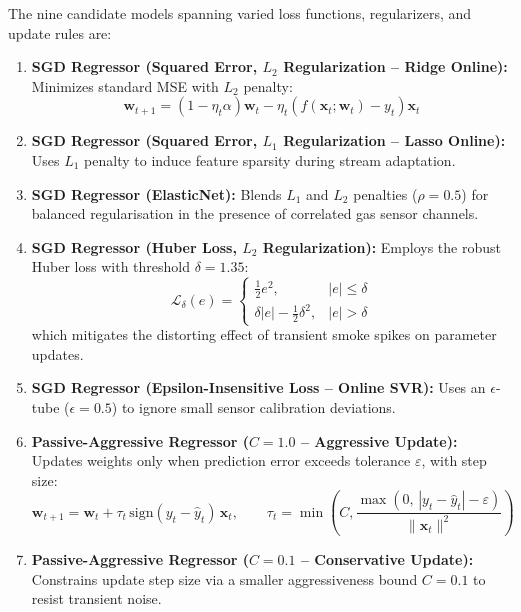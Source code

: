 The nine candidate models spanning varied loss functions, regularizers, and update rules are:
\begin{enumerate}[label=\textbf{M\arabic*:},leftmargin=*]
    \item \textbf{SGD Regressor (Squared Error, $L_2$ Regularization -- Ridge Online):} Minimizes standard MSE with $L_2$ penalty:
    \begin{equation}
    \mathbf{w}_{t+1} = (1 - \eta_t \alpha)\mathbf{w}_t - \eta_t (f(\mathbf{x}_t;\mathbf{w}_t) - y_t)\mathbf{x}_t
    \label{eq:sgd}
    \end{equation}
    \item \textbf{SGD Regressor (Squared Error, $L_1$ Regularization -- Lasso Online):} Uses $L_1$ penalty to induce feature sparsity during stream adaptation.
    \item \textbf{SGD Regressor (ElasticNet):} Blends $L_1$ and $L_2$ penalties ($\rho = 0.5$) for balanced regularisation in the presence of correlated gas sensor channels.
    \item \textbf{SGD Regressor (Huber Loss, $L_2$ Regularization):} Employs the robust Huber loss with threshold $\delta = 1.35$:
    \begin{equation}
    \mathcal{L}_{\delta}(e) = \begin{cases} \frac{1}{2}e^2, & |e| \le \delta \\ \delta |e| - \frac{1}{2}\delta^2, & |e| > \delta \end{cases}
    \label{eq:huber}
    \end{equation}
    which mitigates the distorting effect of transient smoke spikes on parameter updates.
    \item \textbf{SGD Regressor (Epsilon-Insensitive Loss -- Online SVR):} Uses an $\epsilon$-tube ($\epsilon = 0.5$) to ignore small sensor calibration deviations.
    \item \textbf{Passive-Aggressive Regressor ($C = 1.0$ -- Aggressive Update):} Updates weights only when prediction error exceeds tolerance $\varepsilon$, with step size:
    \begin{equation}
    \mathbf{w}_{t+1} = \mathbf{w}_t + \tau_t\, \text{sign}(y_t - \hat{y}_t)\, \mathbf{x}_t, \qquad
    \tau_t = \min\left(C, \frac{\max(0,\, |y_t - \hat{y}_t| - \varepsilon)}{\lVert \mathbf{x}_t \rVert^2}\right)
    \label{eq:pa}
    \end{equation}
    \item \textbf{Passive-Aggressive Regressor ($C = 0.1$ -- Conservative Update):} Constrains update step size via a smaller aggressiveness bound $C=0.1$ to resist transient noise.

\end{enumerate}
